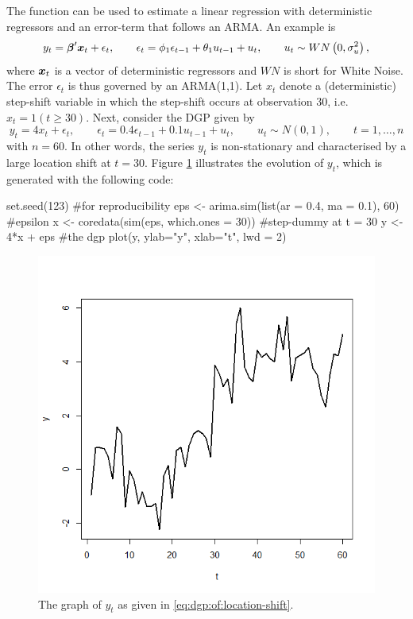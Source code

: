 The function  can be used to estimate a linear regression with deterministic regressors and an error-term that follows an ARMA. An example is
%
\begin{equation*}
	y_t = \boldsymbol{\beta}'\boldsymbol{x}_{t} + \epsilon_t, \qquad \epsilon_t = \phi_1\epsilon_{t-1} + \theta_1 u_{t-1} + u_t, \qquad u_t\sim WN\left(0,\sigma_u^2\right),
\end{equation*} 
%
where $\boldsymbol{x}_t$ is a vector of deterministic regressors and $WN$ is short for White Noise. The error $\epsilon_t$ is thus governed by an ARMA(1,1). Let $x_t$ denote a (deterministic) step-shift variable in which the step-shift occurs at observation 30, i.e.\ $x_t = 1\left(t\geq30\right)$. Next, consider the DGP given by
%
\begin{equation}\label{eq:dgp:of:location-shift}
	y_t = 4x_t + \epsilon_t, \qquad \epsilon_t = 0.4\epsilon_{t-1} + 0.1 u_{t-1} + u_t, \qquad u_t \sim N\left(0,1\right), \qquad t=1,\ldots,n
\end{equation}
%
with $n=60$. In other words, the series $y_t$ is non-stationary and characterised by a large location shift at $t=30$. Figure \ref{figure:step-shift} illustrates the evolution of $y_t$, which is generated with the following code:
%
\begin{example}
  set.seed(123) #for reproducibility
  eps <- arima.sim(list(ar = 0.4, ma = 0.1), 60) #epsilon
  x <- coredata(sim(eps, which.ones = 30)) #step-dummy at t = 30
  y <- 4*x + eps #the dgp
  plot(y, ylab="y", xlab="t", lwd = 2)
\end{example}
%
\begin{figure}[htbp]
	\centering
	\includegraphics[scale=0.5]{step-shift}
	\caption{The graph of $y_t$ as given in \eqref{eq:dgp:of:location-shift}.}
	\label{figure:step-shift}
\end{figure}
